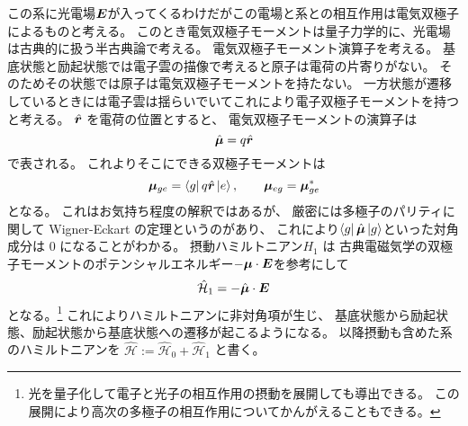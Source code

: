\documentclass[11pt,dvipdfmx,a4paper]{jsarticle}
\begin{document}
この系に光電場\(\vb*{E}\)が入ってくるわけだがこの電場と系との相互作用は電気双極子によるものと考える。
このとき電気双極子モーメントは量子力学的に、光電場は古典的に扱う半古典論で考える。
電気双極子モーメント演算子を考える。
基底状態と励起状態では電子雲の描像で考えると原子は電荷の片寄りがない。
そのためその状態では原子は電気双極子モーメントを持たない。
一方状態が遷移しているときには電子雲は揺らいでいてこれにより電子双極子モーメントを持つと考える。
\(\hat{\vb*{r}}\) を電荷の位置とすると、
電気双極子モーメントの演算子は
\begin{equation}
	\hat{\vb*{\mu}} = q \hat{\vb*{r}}
\end{equation}
で表される。
これよりそこにできる双極子モーメントは
\begin{equation}
	\vb*{\mu}_{ge} = \bra{g}q\hat{\vb*{r}}\ket{e},\qquad \vb*{\mu}_{eg} = \vb*{\mu}_{ge}^{*}
\end{equation}
となる。
これはお気持ち程度の解釈ではあるが、
厳密には多極子のパリティに関して Wigner-Eckart の定理というのがあり、
これにより\(\bra{g}\hat{\vb*{\mu}}\ket{g}\)といった対角成分は \(0\) になることがわかる。
摂動ハミルトニアン\(H_1\) は
古典電磁気学の双極子モーメントのポテンシャルエネルギー\(-\vb*{\mu}\cdot\vb*{E}\)を参考にして
\begin{equation}
	\hat{\mathcal{H}}_1 = - \hat{\vb*{\mu}}\cdot\vb*{E}
\end{equation}
となる。\footnote{光を量子化して電子と光子の相互作用の摂動を展開しても導出できる。
この展開により高次の多極子の相互作用についてかんがえることもできる。}
これによりハミルトニアンに非対角項が生じ、
基底状態から励起状態、励起状態から基底状態への遷移が起こるようになる。
以降摂動も含めた系のハミルトニアンを \(\hat{\mathcal{H}} := \hat{\mathcal{H}}_0 + \hat{\mathcal{H}}_1\) と書く。
\end{document}
